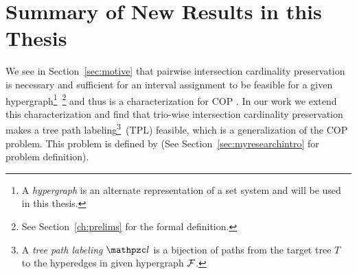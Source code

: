 \section[Summary of new results]{Summary of New Results in this Thesis}
\label{sec:results}

We see in Section~\ref{sec:motive} that pairwise intersection
cardinality preservation is necessary and sufficient for an interval
assignment to be feasible for a given hypergraph\footnote{A {\em
    hypergraph} is an alternate representation of a set system and
  will be used in this thesis.}~\footnote{See Section~\ref{ch:prelims}
  for the formal definition.} and thus is a characterization for COP
\cite{nsnrs09}. In our work we extend this characterization and find
that trio-wise intersection cardinality preservation makes a tree path
labeling\footnote{A {\em tree path labeling} $\cl$ is a bijection of
  paths from the target tree $T$ to the hyperedges in given hypergraph
  ${\cal F}$.}~\footnotemark[4] (TPL) feasible, which is a generalization
of the COP problem. This problem is defined by \FTPL (See
Section~\ref{sec:myresearchintro} for problem definition). %


